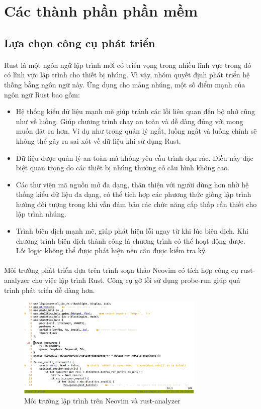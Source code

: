 \section{Các thành phần phần mềm}

\subsection{Lựa chọn công cụ phát triển}
\paragraph{}
Rust là một ngôn ngữ lập trình mới có triển vọng trong nhiều lĩnh vực trong đó có lĩnh vực lập trình cho thiết bị nhúng. Vì vậy, nhóm quyết định phát triển hệ thống bằng ngôn ngữ này. Ứng dụng cho mảng nhúng, một số điểm mạnh của ngôn ngữ Rust bao gồm:
\begin{itemize}
    \item Hệ thống kiểu dữ liệu mạnh mẽ giúp tránh các lỗi liên quan đến bộ nhớ cũng như về luồng. Giúp chương trình chạy an toàn và dễ dàng đúng với mong muốn đặt ra hơn. Ví dụ như trong quản lý ngắt, luồng ngắt và luồng chính sẽ không thể gây ra sai xót về dữ liệu khi sử dụng Rust.
    \item Dữ liệu được quản lý an toàn mà không yêu cầu trình dọn rác. Điều này đặc biệt quan trọng do các thiết bị nhúng thường có cấu hình không cao.
    \item Các thư viện mã nguồn mở đa dạng, thân thiện với người dùng hơn nhờ hệ thống kiểu dữ liệu đa dạng, có thể tích hợp các phương thức giống lập trình hướng đối tượng trong khi vẫn đảm bảo các chức năng cấp thấp cần thiết cho lập trình nhúng.
    \item Trình biên dịch mạnh mẽ, giúp phát hiện lỗi ngay từ khi lúc biên dịch. Khi chương trình biên dịch thành công là chương trình có thể hoạt động được. Lỗi logic không thể được phát hiện nên cần được kiểm tra kỹ.
\end{itemize}

\paragraph{}
Môi trường phát triển dựa trên trình soạn thảo Neovim có tích hợp công cụ rust-analyzer cho việc lập trình Rust. Công cụ gỡ lỗi sử dụng probe-run giúp quá trình phát triển dễ dàng hơn.
\begin{figure}[H]
    \centering
    \includegraphics[width=0.8\textwidth]{images/Screenshot from 2023-06-14 21-28-38.png}
    \caption{Môi trường lập trình trên Neovim và rust-analyzer}
    \label{fig:neovim-environment}
\end{figure}


